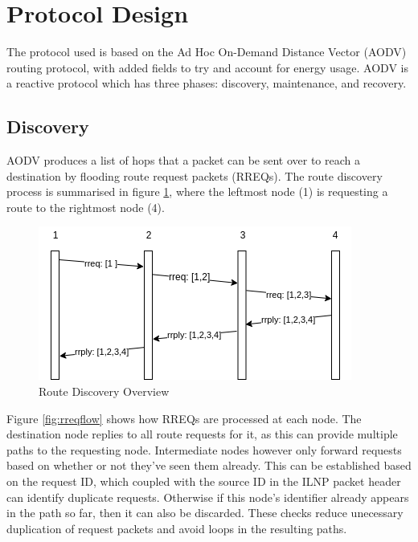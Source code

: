 \documentclass[12pt]{article}
\begin{document}
\pagebreak
\section{Protocol Design} \label{protodesign}

The protocol used is based on the Ad Hoc On-Demand Distance Vector (AODV) routing protocol, with added fields to try and account for energy usage. AODV is a reactive protocol which has three phases: discovery, maintenance, and recovery.

\subsection{Discovery}

AODV produces a list of hops that a packet can be sent over to reach a destination by flooding route request packets (RREQs). The route discovery process is summarised in figure \ref{fig:path}, where the leftmost node (1) is requesting a route to the rightmost node (4).

\begin{figure}[!h]
	\centering
	\includegraphics[width=\linewidth]{images/path}
	\caption{Route Discovery Overview}
	\label{fig:path}
\end{figure}

Figure \ref{fig:rreqflow} shows how RREQs are processed at each node. The destination node replies to all route requests for it, as this can provide multiple paths to the requesting node. Intermediate nodes however only forward requests based on whether or not they've seen them already. This can be established based on the request ID, which coupled with the source ID in the ILNP packet header can identify duplicate requests. Otherwise if this node's identifier already appears in the path so far, then it can also be discarded. These checks reduce unecessary duplication of request packets and avoid loops in the resulting paths.
\end{document}
